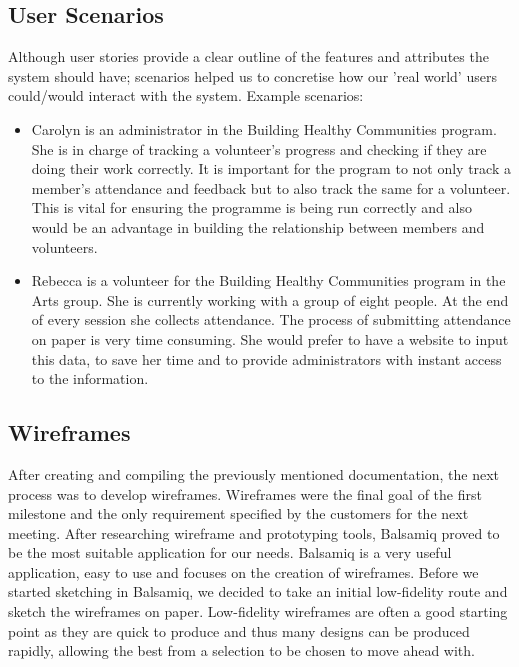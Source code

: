 \documentclass{l3proj}
\begin{document}
\subsection{User Scenarios}
\label{user_scenarios}

Although user stories provide a clear outline of the features and attributes the system should have; scenarios helped us to concretise how our 'real world' users could/would interact with the system.
Example scenarios:
\begin{itemize}
\item Carolyn is an administrator in the Building Healthy Communities program. She is in charge of tracking a volunteer's progress and checking if they are doing their work correctly. It is important for the program to not only track a member's attendance and feedback but to also track the same for a volunteer. This is vital for ensuring the programme is being run correctly and also would be an advantage in building the relationship between members and volunteers.

\item Rebecca is a volunteer for the Building Healthy Communities program in the Arts group. She is currently working with a group of eight people. At the end of every session she collects attendance. The process of submitting attendance on paper is very time consuming. She would prefer to have a website to input this data, to save her time and to provide administrators with instant access to the information.

\end{itemize}

\subsection{Wireframes}
\label{wireframes}

After creating and compiling the previously mentioned documentation, the next process was to develop wireframes. Wireframes were the final goal of the first milestone and the only requirement specified by the customers for the next meeting. After researching wireframe and prototyping tools, Balsamiq proved to be the most suitable application for our needs. Balsamiq is a very useful application, easy to use and focuses on the creation of wireframes. Before we started sketching in Balsamiq, we decided to take an initial low-fidelity route and sketch the wireframes on paper. Low-fidelity wireframes are often a good starting point as they are quick to produce and thus many designs can be produced rapidly, allowing the best from a selection to be chosen to move ahead with.
\end{document}

